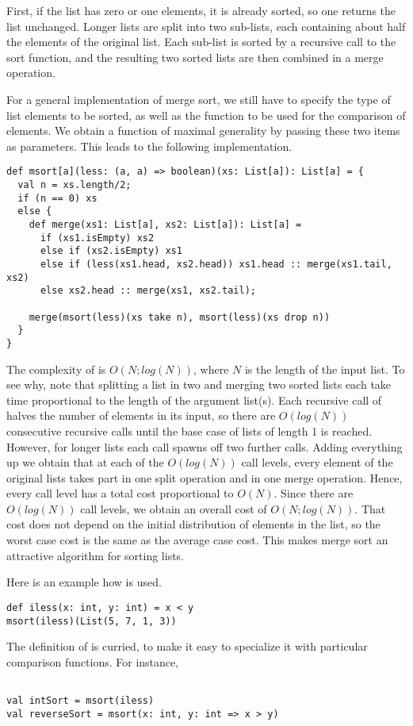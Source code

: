 \documentclass[a4paper,12pt,twoside,titlepage]{book}
\begin{document}
First, if the list has zero or one elements, it is already sorted, so
one returns the list unchanged. Longer lists are split into two
sub-lists, each containing about half the elements of the original
list. Each sub-list is sorted by a recursive call to the sort
function, and the resulting two sorted lists are then combined in a
merge operation.

For a general implementation of merge sort, we still have to specify
the type of list elements to be sorted, as well as the function to be
used for the comparison of elements. We obtain a function of maximal
generality by passing these two items as parameters. This leads to the
following implementation.
\begin{lstlisting}
def msort[a](less: (a, a) => boolean)(xs: List[a]): List[a] = {
  val n = xs.length/2;
  if (n == 0) xs
  else {
    def merge(xs1: List[a], xs2: List[a]): List[a] = 
      if (xs1.isEmpty) xs2
      else if (xs2.isEmpty) xs1
      else if (less(xs1.head, xs2.head)) xs1.head :: merge(xs1.tail, xs2)
      else xs2.head :: merge(xs1, xs2.tail);

    merge(msort(less)(xs take n), msort(less)(xs drop n))
  }
}
\end{lstlisting}
The complexity of  is $O(N;log(N))$, where $N$ is the
length of the input list. To see why, note that splitting a list in
two and merging two sorted lists each take time proportional to the
length of the argument list(s). Each recursive call of 
halves the number of elements in its input, so there are $O(log(N))$
consecutive recursive calls until the base case of lists of length 1
is reached.  However, for longer lists each call spawns off two
further calls. Adding everything up we obtain that at each of the
$O(log(N))$ call levels, every element of the original lists takes
part in one split operation and in one merge operation. Hence, every
call level has a total cost proportional to $O(N)$. Since there are
$O(log(N))$ call levels, we obtain an overall cost of
$O(N;log(N))$. That cost does not depend on the initial distribution
of elements in the list, so the worst case cost is the same as the
average case cost. This makes merge sort an attractive algorithm for
sorting lists.

Here is an example how  is used.
\begin{lstlisting}
def iless(x: int, y: int) = x < y
msort(iless)(List(5, 7, 1, 3))
\end{lstlisting}
The definition of  is curried, to make it easy to specialize it with particular
comparison functions. For instance,
\begin{lstlisting}

val intSort = msort(iless)
val reverseSort = msort(x: int, y: int => x > y)
\end{lstlisting}
\end{document}
